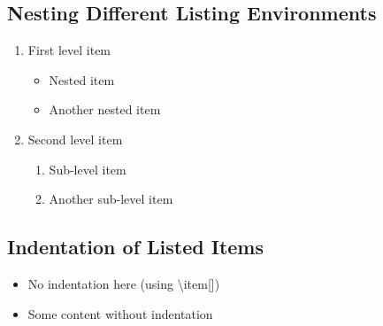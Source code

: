 \documentclass{article}
\begin{document}
\subsection{Nesting Different Listing Environments}
\begin{enumerate}
    \item First level item
          \begin{itemize}
              \item Nested item
              \item Another nested item
          \end{itemize}
    \item Second level item
          \begin{enumerate}
              \item Sub-level item
              \item Another sub-level item
          \end{enumerate}
\end{enumerate}

\subsection{Indentation of Listed Items}
\begin{itemize}
    \item[] No indentation here (using \textbackslash item[])
    \item Some content without indentation
\end{itemize}
\end{document}
